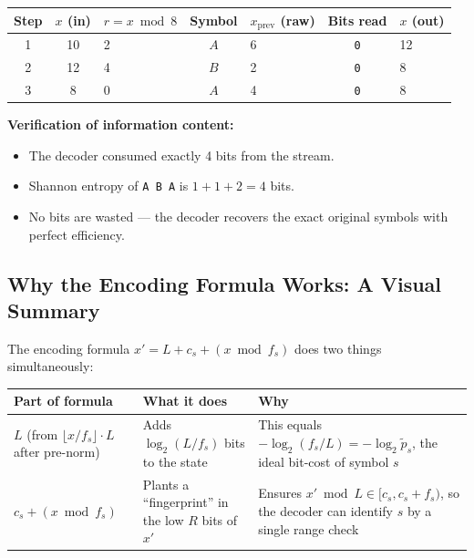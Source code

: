 \begin{examplebox}
\begin{center}
\begin{tabular}{@{}cclclcl@{}}
\toprule
Step & $x$ (in) & $r = x \bmod 8$ & Symbol & $x_{\text{prev}}$ (raw) & Bits read & $x$ (out) \\
\midrule
1 & 10 & 2 & $A$ & 6 & \texttt{0}    & 12 \\
2 & 12 & 4 & $B$ & 2 & \texttt{0\;0} & 8  \\
3 & 8  & 0 & $A$ & 4 & \texttt{0}    & 8  \\
\bottomrule
\end{tabular}
\end{center}

\medskip
\noindent\textbf{Verification of information content:}
\begin{itemize}
  \item The decoder consumed exactly 4 bits from the stream.
  \item Shannon entropy of \texttt{A B A} is $1 + 1 + 2 = 4$ bits.
  \item No bits are wasted — the decoder recovers the exact
        original symbols with perfect efficiency.
\end{itemize}
\end{examplebox}


\subsection{Why the Encoding Formula Works: A Visual Summary}

The encoding formula $x' = L + c_s + (x \bmod f_s)$ does
two things simultaneously:

\begin{center}
\renewcommand{\arraystretch}{1.4}
\begin{tabular}{@{}p{4cm}p{4.5cm}p{5cm}@{}}
\toprule
\textbf{Part of formula} & \textbf{What it does} & \textbf{Why} \\
\midrule
$L$ \newline (from $\lfloor x/f_s\rfloor \cdot L$
after pre-norm) &
Adds $\log_2(L/f_s)$ bits to the state &
This equals $-\log_2(f_s/L) = -\log_2 \tilde{p}_s$, the
ideal bit-cost of symbol $s$ \\
\midrule
$c_s + (x \bmod f_s)$ &
Plants a ``fingerprint'' in the low $R$ bits of $x'$ &
Ensures $x' \bmod L \in [c_s, c_s+f_s)$, so the decoder
can identify $s$ by a single range check \\
\bottomrule
\end{tabular}
\end{center}

